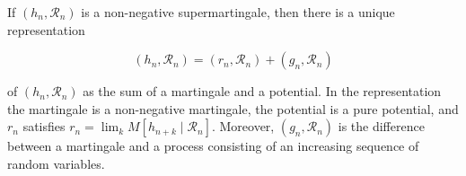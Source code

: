If $(h_n, \mathcal{R}_n)$ is a non-negative supermartingale, then there is a unique representation

$$\left(h_n, \mathcal{R}_n\right) = \left(r_n, \mathcal{R}_n\right) + \left(g_n, \mathcal{R}_n\right)$$

of $(h_n, \mathcal{R}_n)$ as the sum of a martingale and a potential. In the representation the martingale is a non-negative martingale, the potential is a pure potential, and $r_n$ satisfies $r_n = \lim_k M\left[h_{n+k} \mid \mathcal{R}_n\right]$. Moreover, $(g_n, \mathcal{R}_n)$ is the difference between a martingale and a process consisting of an increasing sequence of random variables.
